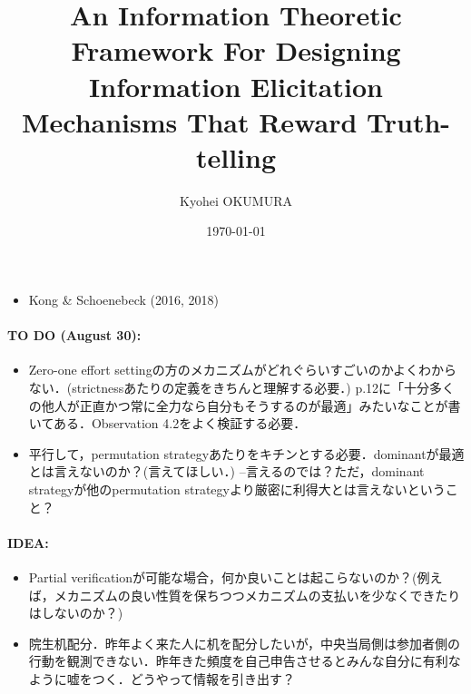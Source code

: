 \documentclass[11pt,a4paper,dvipdfmx]{article}
\theoremstyle{plain}
\newcommand{\1}{\mathbbm{1}}
\begin{document}
\title{
An Information Theoretic Framework For Designing Information Elicitation Mechanisms That Reward Truth-telling}
\author{Kyohei OKUMURA
}
\date{\today}
\maketitle


\begin{itemize}
	\item Kong \& Schoenebeck (2016, 2018)
\end{itemize}
\begin{screen}
\paragraph{TO DO (August 30):}
\begin{itemize}
	\item Zero-one effort settingの方のメカニズムがどれぐらいすごいのかよくわからない．(strictnessあたりの定義をきちんと理解する必要．) p.12に「十分多くの他人が正直かつ常に全力なら自分もそうするのが最適」みたいなことが書いてある．Observation 4.2をよく検証する必要．
	\item 平行して，permutation strategyあたりをキチンとする必要．dominantが最適とは言えないのか？(言えてほしい．) --言えるのでは？ただ，dominant strategyが他のpermutation strategyより厳密に利得大とは言えないということ？
\end{itemize}	
\end{screen}

\begin{screen}
\paragraph{IDEA:}
\begin{itemize}
	\item Partial verificationが可能な場合，何か良いことは起こらないのか？(例えば，メカニズムの良い性質を保ちつつメカニズムの支払いを少なくできたりはしないのか？)
	\item 院生机配分．昨年よく来た人に机を配分したいが，中央当局側は参加者側の行動を観測できない．昨年きた頻度を自己申告させるとみんな自分に有利なように嘘をつく．どうやって情報を引き出す？
\end{itemize}	
\end{screen}
\end{document}

